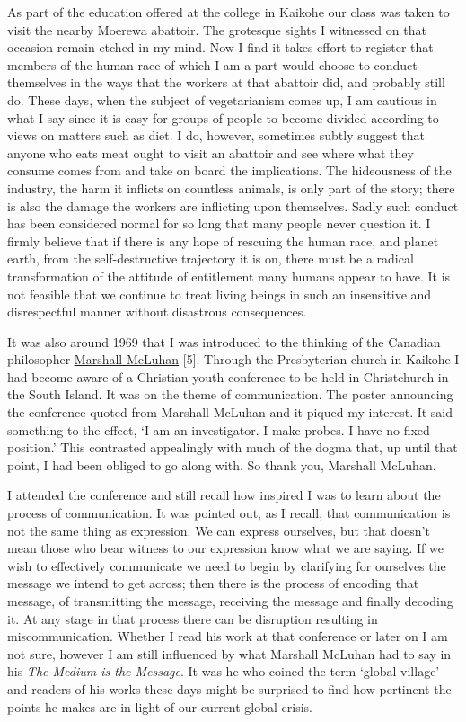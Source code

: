 As part of the education offered at the college in Kaikohe our class was
taken to visit the nearby Moerewa abattoir. The grotesque sights I
witnessed on that occasion remain etched in my mind. Now I find it takes
effort to register that members of the human race of which I am a part
would choose to conduct themselves in the ways that the workers at that
abattoir did, and probably still do. These days, when the subject of
vegetarianism comes up, I am cautious in what I say since it is easy for
groups of people to become divided according to views on matters such as
diet. I do, however, sometimes subtly suggest that anyone who eats meat
ought to visit an abattoir and see where what they consume comes from
and take on board the implications. The hideousness of the industry, the
harm it inflicts on countless animals, is only part of the story; there
is also the damage the workers are inflicting upon themselves. Sadly
such conduct has been considered normal for so long that many people
never question it. I firmly believe that if there is any hope of
rescuing the human race, and planet earth, from the self-destructive
trajectory it is on, there must be a radical transformation of the
attitude of entitlement many humans appear to have. It is not feasible
that we continue to treat living beings in such an insensitive and
disrespectful manner without disastrous consequences.

It was also around 1969 that I was introduced to the thinking of the
Canadian philosopher
\href{https://www.marshallmcluhan.com/common-questions/}{\underline{Marshall
McLuhan}} {[}5{]}. Through the Presbyterian church in Kaikohe I had
become aware of a Christian youth conference to be held in Christchurch
in the South Island. It was on the theme of communication. The poster
announcing the conference quoted from Marshall McLuhan and it piqued my
interest. It said something to the effect, `I am an investigator. I make
probes. I have no fixed position.' This contrasted appealingly with much
of the dogma that, up until that point, I had been obliged to go along
with. So thank you, Marshall McLuhan.

I attended the conference and still recall how inspired I was to learn
about the process of communication. It was pointed out, as I recall,
that communication is not the same thing as expression. We can express
ourselves, but that doesn't mean those who bear witness to our
expression know what we are saying. If we wish to effectively
communicate we need to begin by clarifying for ourselves the message we
intend to get across; then there is the process of encoding that
message, of transmitting the message, receiving the message and finally
decoding it. At any stage in that process there can be disruption
resulting in miscommunication. Whether I read his work at that
conference or later on I am not sure, however I am still influenced by
what Marshall McLuhan had to say in his \emph{The Medium is the
Message}. It was he who coined the term `global village' and readers of
his works these days might be surprised to find how pertinent the points
he makes are in light of our current global crisis.

